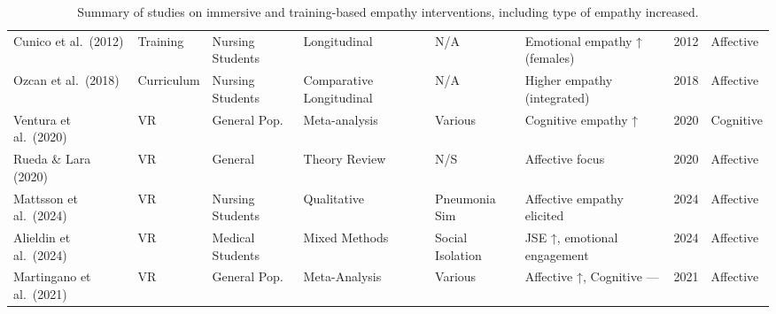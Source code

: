 \begin{table}[htbp]
{\begin{tabular}{|p{2.8cm}|p{1.4cm}|p{2cm}|p{2.4cm}|p{2.6cm}|p{3.6cm}|p{0.8cm}|p{1.6cm}|}
    Cunico et al.\ (2012) & Training & Nursing Students & Longitudinal & N/A & Emotional empathy ↑ (females) & 2012 & Affective \\
    Ozcan et al.\ (2018) & Curriculum & Nursing Students & Comparative Longitudinal & N/A & Higher empathy (integrated) & 2018 & Affective \\
    Ventura et al.\ (2020) & VR & General Pop. & Meta-analysis & Various & Cognitive empathy ↑ & 2020 & Cognitive \\
    Rueda \& Lara (2020) & VR & General & Theory Review & N/S & Affective focus & 2020 & Affective \\
    Mattsson et al.\ (2024) & VR & Nursing Students & Qualitative & Pneumonia Sim & Affective empathy elicited & 2024 & Affective \\
    Alieldin et al.\ (2024) & VR & Medical Students & Mixed Methods & Social Isolation & JSE ↑, emotional engagement & 2024 & Affective \\
    Martingano et al.\ (2021) & VR & General Pop. & Meta-Analysis & Various & Affective ↑, Cognitive — & 2021 & Affective \\
    \hline
    \end{tabular}%
    }
    \caption{Summary of studies on immersive and training-based empathy interventions, including type of empathy increased.}
    \label{tab:empathy_summary}
    \end{table}
    